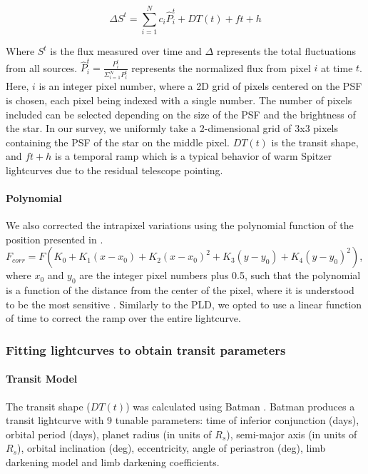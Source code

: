 \begin{equation}
    \Delta S^t = \sum_{i=1}^{N}c_i \hat{P}_i^t + DT(t) + ft + h
\end{equation}

Where $S^t$ is the flux measured over time and $\Delta$ represents the total fluctuations from all sources. $\hat{P}_i^t = \frac{P_i^t}{\Sigma_{i=1}^{N}P_i^t}$ represents the normalized flux from pixel $i$ at time $t$. Here, $i$ is an integer pixel number, where a 2D grid of pixels centered on the PSF is chosen, each pixel being indexed with a single number. The number of pixels included can be selected depending on the size of the PSF and the brightness of the star. In our survey, we uniformly take a 2-dimensional grid of 3x3 pixels containing the PSF of the star on the middle pixel. $DT(t)$ is the transit shape, and $ft+h$ is a temporal ramp which is a typical behavior of warm Spitzer lightcurves due to the residual telescope pointing.

\paragraph{Polynomial}

We also corrected the intrapixel variations using the polynomial function of the position presented in \citet{Knutson2008}. $F_{corr} = F(K_0 + K_1(x-x_0) + K_2(x-x_0)^2 + K_3(y-y_0) + K_4(y-y_0)^2 )$, where $x_0$ and $y_0$ are the integer pixel numbers plus 0.5, such that the polynomial is a function of the distance from the center of the pixel, where it is understood to be the most sensitive \citep{Stevenson2012}. Similarly to the PLD, we opted to use a linear function of time to correct the ramp over the entire lightcurve.

\subsubsection{Fitting lightcurves to obtain transit parameters}

\paragraph{Transit Model}

The transit shape ($DT(t)$) was calculated using Batman \citep{Kreidberg2015}. Batman produces a transit lightcurve with 9 tunable parameters:
time of inferior conjunction (days),
orbital period (days),
planet radius (in units of $R_s$),
semi-major axis (in units of $R_s$),
orbital inclination (deg),
eccentricity,
angle of periastron (deg),
limb darkening model and limb darkening coefficients.

